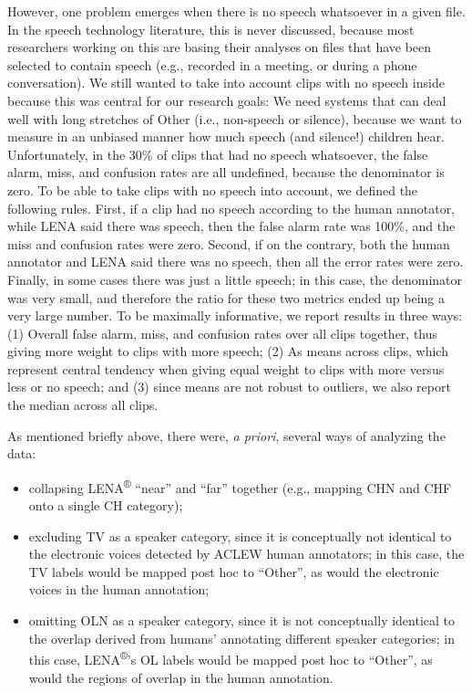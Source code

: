 \documentclass[english,table,man,floatsintext]{apa6}
\providecommand{\tightlist}{%
  \setlength{\itemsep}{0pt}\setlength{\parskip}{0pt}}
\begin{document}
However, one problem emerges when there is no speech whatsoever in a given file. In the speech technology literature, this is never discussed, because most researchers working on this are basing their analyses on files that have been selected to contain speech (e.g., recorded in a meeting, or during a phone conversation). We still wanted to take into account clips with no speech inside because this was central for our research goals: We need systems that can deal well with long stretches of Other (i.e., non-speech or silence), because we want to measure in an unbiased manner how much speech (and silence!) children hear. Unfortunately, in the 30\% of clips that had no speech whatsoever, the false alarm, miss, and confusion rates are all undefined, because the denominator is zero.
To be able to take clips with no speech into account, we defined the following rules. First, if a clip had no speech according to the human annotator, while LENA said there was speech, then the false alarm rate was 100\%, and the miss and confusion rates were zero. Second, if on the contrary, both the human annotator and LENA said there was no speech, then all the error rates were zero. Finally, in some cases there was just a little speech; in this case, the denominator was very small, and therefore the ratio for these two metrics ended up being a very large number. To be maximally informative, we report results in three ways: (1) Overall false alarm, miss, and confusion rates over all clips together, thus giving more weight to clips with more speech; (2) As means across clips, which represent central tendency when giving equal weight to clips with more versus less or no speech; and (3) since means are not robust to outliers, we also report the median across all clips.

As mentioned briefly above, there were, \emph{a priori}, several ways of analyzing the data:

\begin{itemize}
\tightlist
\item
  collapsing LENA\textsuperscript{®} \enquote{near} and \enquote{far} together (e.g., mapping CHN and CHF onto a single CH category);
\item
  excluding TV as a speaker category, since it is conceptually not identical to the electronic voices detected by ACLEW human annotators; in this case, the TV labels would be mapped post hoc to \enquote{Other}, as would the electronic voices in the human annotation;
\item
  omitting OLN as a speaker category, since it is not conceptually identical to the overlap derived from humans' annotating different speaker categories; in this case, LENA\textsuperscript{®}'s OL labels would be mapped post hoc to \enquote{Other}, as would the regions of overlap in the human annotation.
\end{itemize}
\end{document}
